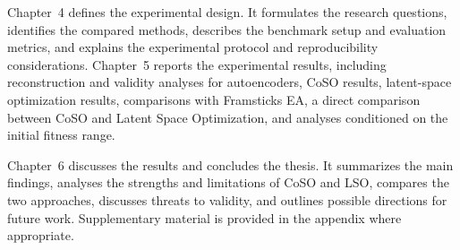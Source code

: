 Chapter~4 defines the experimental design. It formulates the research questions, identifies the compared methods, describes the benchmark setup and evaluation metrics, and explains the experimental protocol and reproducibility considerations. Chapter~5 reports the experimental results, including reconstruction and validity analyses for autoencoders, CoSO results, latent-space optimization results, comparisons with Framsticks EA, a direct comparison between CoSO and Latent Space Optimization, and analyses conditioned on the initial fitness range.

Chapter~6 discusses the results and concludes the thesis. It summarizes the main findings, analyses the strengths and limitations of CoSO and LSO, compares the two approaches, discusses threats to validity, and outlines possible directions for future work. Supplementary material is provided in the appendix where appropriate.
